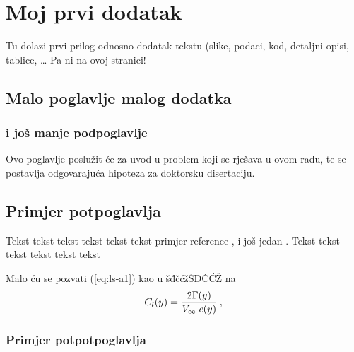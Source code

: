 \documentclass[a4paper,12pt]{report}
\def\Vinf{\hbox{$V_{\infty}$}} %
\begin{document}
\clearpage


%




\appendix
\chapter{Moj prvi dodatak}
Tu dolazi prvi prilog odnosno dodatak tekstu (slike, podaci, kod, detaljni
opisi, tablice, \ldots
\newpage 
Pa ni na ovoj stranici!
\section{Malo poglavlje malog dodatka}
\subsection{i još manje podpoglavlje}
Ovo poglavlje poslu\v{z}it \'{c}e za uvod u problem koji se rje\v{s}ava u ovom
radu, te se postavlja odgovaraju\'{c}a hipoteza za doktorsku
disertaciju.

\section{Primjer potpoglavlja}
Tekst tekst tekst tekst tekst tekst primjer reference
\cite{mastersthesis-minimal}, i jo\v{s} jedan \cite{inbook-full}.
Tekst tekst tekst tekst tekst tekst 

Malo ću se pozvati (\eqref{eq:ls-a1}) kao u šđčćžŠĐČĆŽ na 
\begin{equation}\label{eq:ls-a1}
	C_l(y)=\frac{2\Gamma(y)}{\Vinf\;c(y)}\:,
\end{equation}
%

\subsection{Primjer potpotpoglavlja}
\end{document}
